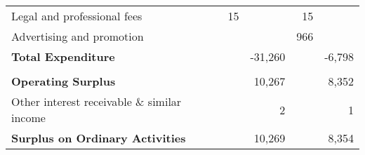 \begin{center}
\begin{tabular}{ l  r  r r r }
Legal and professional fees & 15     &        & 15    &   \\
Advertising and promotion   &        &        & 966   &   \\
{\bf Total Expenditure}     &        & -31,260&       & -6,798 \\
\cmidrule(r){2-3} \cmidrule(r){4-5} \\
{\bf Operating Surplus}     &        & 10,267 &       & 8,352 \\
Other interest receivable 
\& similar income           &        & 2      &       &   1 \\
{\bf Surplus on Ordinary Activities} & & 10,269 &  & 8,354 \\
\bottomrule
\end{tabular}
\end{center}
\pagebreak
